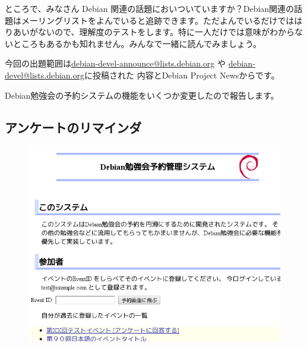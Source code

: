 \documentclass[mingoth,a4paper]{jsarticle}
\begin{document}

ところで、みなさん Debian 関連の話題においついていますか？Debian関連の話
題はメーリングリストをよんでいると追跡できます。ただよんでいるだけではは
りあいがないので、理解度のテストをします。特に一人だけでは意味がわからな
いところもあるかも知れません。みんなで一緒に読んでみましょう。

今回の出題範囲は\url{debian-devel-announce@lists.debian.org} や \url{debian-devel@lists.debian.org}に投稿された
内容とDebian Project Newsからです。

\begin{multicols}{2}
 
\end{multicols}


Debian勉強会の予約システムの機能をいくつか変更したので報告します。

\subsection{アンケートのリマインダ}

\begin{figure}
\includegraphics[width=1\hsize]{image201304/enquetereminder.png}
\end{figure}
\end{document}
